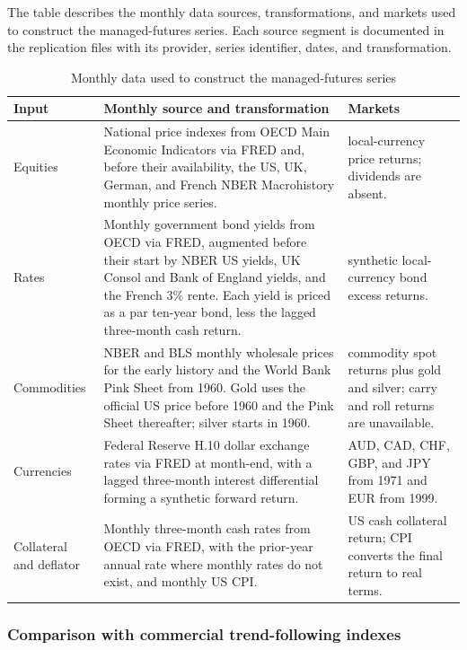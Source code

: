 \begin{table}[p]
\centering
\caption{Monthly data used to construct the managed-futures series}
\label{tab:mf-monthly-sources}
\begin{minipage}{\linewidth}\small The table describes the monthly data sources, transformations, and
markets used to construct the managed-futures series. Each source segment is documented in the
replication files with its provider, series identifier, dates, and transformation.\end{minipage}
\medskip

\small
\begin{tabular}{>{\raggedright\arraybackslash}p{}>{\raggedright\arraybackslash}p{}>{\raggedright\arraybackslash}p{}}
\toprule
Input & Monthly source and transformation & Markets \\
\midrule
Equities & National price indexes from OECD Main Economic Indicators via FRED and, before their availability, the US, UK, German, and French NBER Macrohistory monthly price series. & 18 local-currency price returns; dividends are absent. \\
Rates & Monthly government bond yields from OECD via FRED, augmented before their start by NBER US yields, UK Consol and Bank of England yields, and the French 3\% rente. Each yield is priced as a par ten-year bond, less the lagged three-month cash return. & 18 synthetic local-currency bond excess returns. \\
Commodities & NBER and BLS monthly wholesale prices for the early history and the World Bank Pink Sheet from 1960. Gold uses the official US price before 1960 and the Pink Sheet thereafter; silver starts in 1960. & 19 commodity spot returns plus gold and silver; carry and roll returns are unavailable. \\
Currencies & Federal Reserve H.10 dollar exchange rates via FRED at month-end, with a lagged three-month interest differential forming a synthetic forward return. & AUD, CAD, CHF, GBP, and JPY from 1971 and EUR from 1999. \\
Collateral and deflator & Monthly three-month cash rates from OECD via FRED, with the prior-year annual rate where monthly rates do not exist, and monthly US CPI. & US cash collateral return; CPI converts the final return to real terms. \\
\bottomrule
\end{tabular}
\end{table}

\subsubsection{Comparison with commercial trend-following indexes}
\label{app:mf-external}

